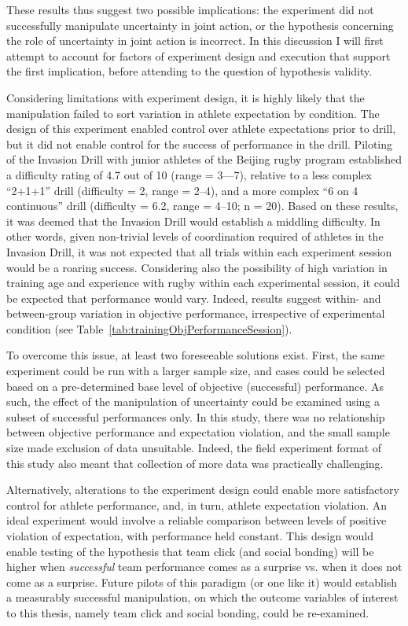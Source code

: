 \begin{CJK}{UTF8}{gbsn}
These results thus suggest two possible implications: the experiment did not successfully manipulate uncertainty in joint action, or the hypothesis concerning the role of uncertainty in joint action is incorrect.  In this discussion I will first attempt to account for factors of experiment design and execution that support the first implication, before attending to the question of hypothesis validity.


Considering limitations with experiment design, it is highly likely that the manipulation failed to sort variation in athlete expectation by condition.  The design of this experiment enabled control over athlete expectations prior to drill, but it did not enable control for the success of performance in the drill.  Piloting of the Invasion Drill with junior athletes of the Beijing rugby program established a difficulty rating of 4.7 out of 10 (range = 3—7), relative to a less complex ``2+1+1'' drill (difficulty = 2, range = 2–4), and a more complex ``6 on 4 continuous'' drill (difficulty = 6.2, range = 4–10; n = 20).  Based on these results, it was deemed that the Invasion Drill would establish a middling difficulty.  In other words, given non-trivial levels of coordination required of athletes in the Invasion Drill, it was not expected that all trials within each experiment session would be a roaring success.  Considering also the possibility of high variation in training age and experience with rugby within each experimental session, it could be expected that performance would vary.  Indeed, results suggest within- and between-group variation in objective performance, irrespective of experimental condition (see Table~\ref{tab:trainingObjPerformanceSession}).

To overcome this issue, at least two foreseeable solutions exist.  First, the same experiment could be run with a larger sample size, and cases could be selected based on a pre-determined base level of objective (successful) performance.  As such, the effect of the manipulation of uncertainty could be examined using a subset of successful performances only.  In this study, there was no relationship between objective performance and expectation violation, and the small sample size made exclusion of data unsuitable.  Indeed, the field experiment format of this study also meant that collection of more data was practically challenging.

Alternatively, alterations to the experiment design could enable more satisfactory control for athlete performance, and, in turn, athlete expectation violation.  An ideal experiment would involve a reliable comparison between levels of positive violation of expectation, with performance held constant.  This design would enable testing of the hypothesis that team click (and social bonding) will be higher when \textit{successful} team performance comes as a surprise vs. when it does not come as a surprise.  Future pilots of this paradigm (or one like it) would establish a measurably successful manipulation, on which the outcome variables of interest to this thesis, namely team click and social bonding, could be re-examined.


\end{CJK}

